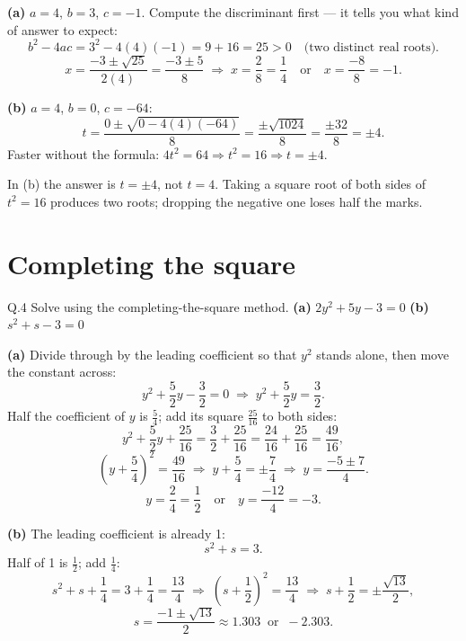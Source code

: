 \begin{solution}
\textbf{(a)} $a=4$, $b=3$, $c=-1$. Compute the discriminant first --- it tells
you what kind of answer to expect:
\[
b^{2}-4ac=3^{2}-4(4)(-1)=9+16=25>0 \quad\text{(two distinct real roots)}.
\]
\[
x=\frac{-3\pm\sqrt{25}}{2(4)}=\frac{-3\pm 5}{8}
\;\Longrightarrow\;
x=\frac{2}{8}=\frac14 \quad\text{or}\quad x=\frac{-8}{8}=-1 .
\]

\medskip
\textbf{(b)} $a=4$, $b=0$, $c=-64$:
\[
t=\frac{0\pm\sqrt{0-4(4)(-64)}}{8}=\frac{\pm\sqrt{1024}}{8}=\frac{\pm 32}{8}
=\pm 4 .
\]
Faster without the formula: $4t^{2}=64 \Rightarrow t^{2}=16 \Rightarrow t=\pm4$.

\end{solution}

\begin{pitfall}
In (b) the answer is $t=\pm 4$, not $t=4$. Taking a square root of both sides
of $t^{2}=16$ produces two roots; dropping the negative one loses half the
marks.
\end{pitfall}

\section{Completing the square}

\begin{question}{Q.4}
Solve using the completing-the-square method.
\textbf{(a)} $2y^{2}+5y-3=0$ \quad \textbf{(b)} $s^{2}+s-3=0$
\end{question}

\begin{solution}
\textbf{(a)} Divide through by the leading coefficient so that $y^{2}$ stands
alone, then move the constant across:
\[
y^{2}+\frac{5}{2}y-\frac{3}{2}=0
\;\Longrightarrow\;
y^{2}+\frac{5}{2}y=\frac{3}{2}.
\]
Half the coefficient of $y$ is $\tfrac54$; add its square $\tfrac{25}{16}$ to
both sides:
\[
y^{2}+\frac{5}{2}y+\frac{25}{16}=\frac{3}{2}+\frac{25}{16}
=\frac{24}{16}+\frac{25}{16}=\frac{49}{16},
\]
\[
\left(y+\frac54\right)^{2}=\frac{49}{16}
\;\Longrightarrow\;
y+\frac54=\pm\frac74
\;\Longrightarrow\;
y=\frac{-5\pm 7}{4}.
\]
\[
y=\frac{2}{4}=\frac12 \quad\text{or}\quad y=\frac{-12}{4}=-3 .
\]

\medskip
\textbf{(b)} The leading coefficient is already 1:
\[
s^{2}+s=3 .
\]
Half of 1 is $\tfrac12$; add $\tfrac14$:
\[
s^{2}+s+\frac14=3+\frac14=\frac{13}{4}
\;\Longrightarrow\;
\left(s+\frac12\right)^{2}=\frac{13}{4}
\;\Longrightarrow\;
s+\frac12=\pm\frac{\sqrt{13}}{2},
\]
\[
s=\frac{-1\pm\sqrt{13}}{2}\approx 1.303 \ \text{ or } \ -2.303 .
\]

\end{solution}

